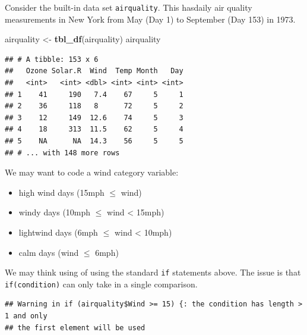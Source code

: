 \documentclass[
]{book}
\newenvironment{Shaded}{\begin{snugshade}}{\end{snugshade}}
\newcommand{\ControlFlowTok}[1]{\textcolor[rgb]{0.13,0.29,0.53}{\textbf{#1}}}
\newcommand{\DecValTok}[1]{\textcolor[rgb]{0.00,0.00,0.81}{#1}}
\newcommand{\KeywordTok}[1]{\textcolor[rgb]{0.13,0.29,0.53}{\textbf{#1}}}
\newcommand{\NormalTok}[1]{#1}
\newcommand{\OperatorTok}[1]{\textcolor[rgb]{0.81,0.36,0.00}{\textbf{#1}}}
\newcommand{\StringTok}[1]{\textcolor[rgb]{0.31,0.60,0.02}{#1}}
\providecommand{\tightlist}{%
  \setlength{\itemsep}{0pt}\setlength{\parskip}{0pt}}
\theoremstyle{definition}
\theoremstyle{definition}
\theoremstyle{definition}
\theoremstyle{remark}
\begin{document}
Consider the built-in data set \texttt{airquality}. This hasdaily air quality measurements in New York from May (Day 1) to September (Day 153) in 1973.

\begin{Shaded}
\begin{Highlighting}[]
\NormalTok{airquality <-}\StringTok{ }\KeywordTok{tbl_df}\NormalTok{(airquality)}
\NormalTok{airquality}
\end{Highlighting}
\end{Shaded}

\begin{verbatim}
## # A tibble: 153 x 6
##   Ozone Solar.R  Wind  Temp Month   Day
##   <int>   <int> <dbl> <int> <int> <int>
## 1    41     190   7.4    67     5     1
## 2    36     118   8      72     5     2
## 3    12     149  12.6    74     5     3
## 4    18     313  11.5    62     5     4
## 5    NA      NA  14.3    56     5     5
## # ... with 148 more rows
\end{verbatim}

We may want to code a wind category variable:

\begin{itemize}
\tightlist
\item
  high wind days (15mph \(\leq\) wind)\\
\item
  windy days (10mph \(\leq\) wind \textless{} 15mph)\\
\item
  lightwind days (6mph \(\leq\) wind \textless{} 10mph)\\
\item
  calm days (wind \(\leq\) 6mph)
\end{itemize}

We may think using of using the standard \texttt{if} statements above. The issue is that \texttt{if(condition)} can only take in a single comparison.

\begin{Shaded}
\end{Shaded}

\begin{verbatim}
## Warning in if (airquality$Wind >= 15) {: the condition has length > 1 and only
## the first element will be used
\end{verbatim}
\end{document}

